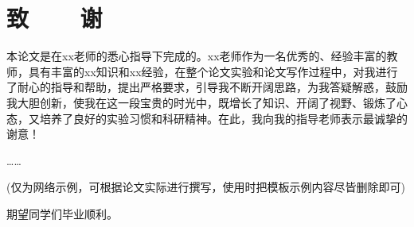 

\renewcommand{\baselinestretch}{1.5}
\fontsize{12pt}{13pt}\selectfont

\chapter*{致~~~~谢}
{}
本论文是在xx老师的悉心指导下完成的。xx老师作为一名优秀的、经验丰富的教师，具有丰富的xx知识和xx经验，在整个论文实验和论文写作过程中，对我进行了耐心的指导和帮助，提出严格要求，引导我不断开阔思路，为我答疑解惑，鼓励我大胆创新，使我在这一段宝贵的时光中，既增长了知识、开阔了视野、锻炼了心态，又培养了良好的实验习惯和科研精神。在此，我向我的指导老师表示最诚挚的谢意！

……

(仅为网络示例，可根据论文实际进行撰写，使用时把模板示例内容尽皆删除即可)



期望同学们毕业顺利。